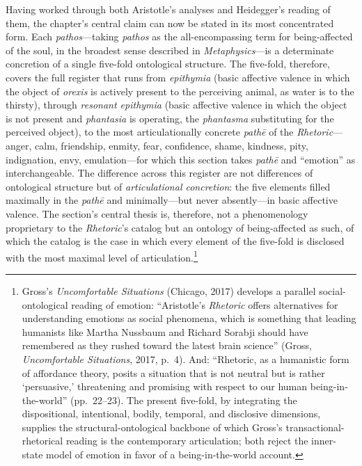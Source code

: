 \documentclass{article}
\begin{document}
Having worked through both Aristotle's analyses and Heidegger's reading of them, the chapter's central claim can now be stated in its most concentrated form. Each \textit{pathos}---taking \textit{pathos} as the all-encompassing term for being-affected of the soul, in the broadest sense described in \textit{Metaphysics}---is a determinate concretion of a single five-fold ontological structure. The five-fold, therefore, covers the full register that runs from \textit{epithymia} (basic affective valence in which the object of \textit{orexis} is actively present to the perceiving animal, as water is to the thirsty), through \textit{resonant epithymia} (basic affective valence in which the object is not present and \textit{phantasia} is operating, the \textit{phantasma} substituting for the perceived object), to the most articulationally concrete \textit{pathē} of the \textit{Rhetoric}---anger, calm, friendship, enmity, fear, confidence, shame, kindness, pity, indignation, envy, emulation---for which this section takes \textit{pathē} and ``emotion'' as interchangeable. The difference across this register are not differences of ontological structure but of \textit{articulational concretion}: the five elements filled maximally in the \textit{pathē} and minimally---but never absently---in basic affective valence. The section's central thesis is, therefore, not a phenomenology proprietary to the \textit{Rhetoric}'s catalog but an ontology of being-affected as such, of which the catalog is the case in which every element of the five-fold is disclosed with the most maximal level of articulation.\footnote{Gross's \textit{Uncomfortable Situations} (Chicago, 2017) develops a parallel social-ontological reading of emotion: ``Aristotle's \textit{Rhetoric} offers alternatives for understanding emotions as social phenomena, which is something that leading humanists like Martha Nussbaum and Richard Sorabji should have remembered as they rushed toward the latest brain science'' (Gross, \textit{Uncomfortable Situations}, 2017, p.~4). And: ``Rhetoric, as a humanistic form of affordance theory, posits a situation that is not neutral but is rather `persuasive,' threatening and promising with respect to our human being-in-the-world'' (pp.~22--23). The present five-fold, by integrating the dispositional, intentional, bodily, temporal, and disclosive dimensions, supplies the structural-ontological backbone of which Gross's transactional-rhetorical reading is the contemporary articulation; both reject the inner-state model of emotion in favor of a being-in-the-world account.}
\end{document}
